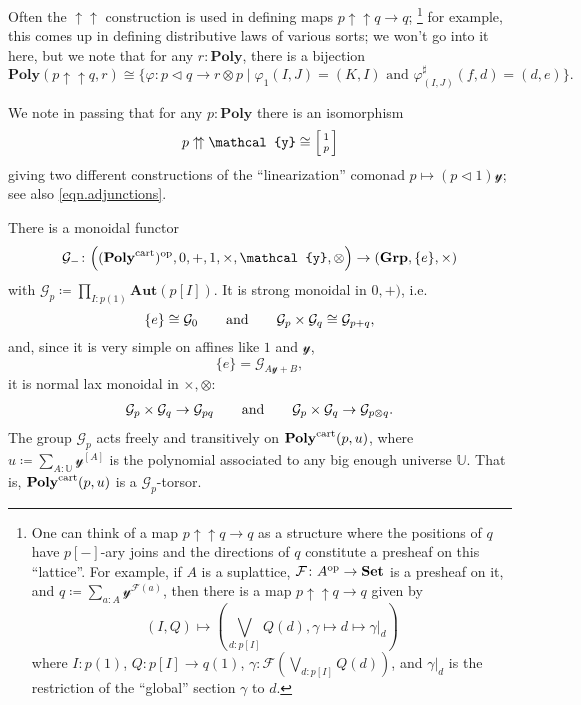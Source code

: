 \documentclass[11pt, one side, article]{memoir}
\makeatletter
\theoremstyle{definition}
\theoremstyle{plain}
\newcommand{\cat}[1]{\mathcal{#1}}%
\newcommand{\Cat}[1]{\mathbf{#1}}%
\newcommand{\op}{^\tn{op}}
\newcommand{\tn}[1]{\textnormal{#1}}
\newcommand{\smset}{\Cat{Set}}
\newcommand{\grp}{\Cat{Grp}}
\newcommand{\Aut}{\Cat{Aut}}
\newcommand{\yon}{{\mathcal{y}}}
\newcommand{\poly}{\Cat{Poly}}
\newcommand{\cart}{\tn{cart}}
\newcommand{\polycart}{\poly^\cart}
\newcommand{\0}{\textsf{0}}
\newcommand{\1}{\tn{\textsf{1}}}
\newcommand{\tri}{\mathbin{\triangleleft}}
\newcommand{\biglens}[2]{
     \begin{bmatrix}{\vphantom{f_f^f}#2} \\ {\vphantom{f_f^f}#1} \end{bmatrix}
}
\newcommand{\littlelens}[2]{
     \begin{bsmallmatrix}{\vphantom{f}#2} \\ {\vphantom{f}#1} \end{bsmallmatrix}
}
\newcommand{\lens}[2]{
  \relax\if@display
     \biglens{#1}{#2}
  \else
     \littlelens{#1}{#2}
  \fi
}
\newcommand{\upup}{\uparrow\!\uparrow}
\newcommand{\hh}[2][]{#1 \tn{#2} #1}
\newcommand{\qqand}{\hh[\qquad]{and}}
\makeatother
\begin{document}
Often the $\upup$ construction is used in defining maps $p\upup q\to q$;
\footnote{One can think of a map $p\upup q\to q$ as a structure where the positions of $q$ have $p[-]$-ary joins and the directions of $q$ constitute a presheaf on this ``lattice''. For example, if $A$ is a suplattice, $\cat{F}\colon A\op\to\smset$ is a presheaf on it, and $q\coloneqq\sum_{a:A}\yon^{\cat{F}(a)}$, then there is a map $p\upup q\to q$ given by
\[
  (I,Q)\mapsto
  \left(
  	\bigvee_{d:p[I]}Q(d), \gamma\mapsto d\mapsto \gamma\big|_d
  \right)
\]
where $I:p(1)$, $Q\colon p[I]\to q(1)$, $\gamma:\cat{F}(\bigvee_{d:p[I]}Q(d))$, and $\gamma\big|_{d}$ is the restriction of the ``global'' section $\gamma$ to $d$.
}
 for example, this comes up in defining distributive laws of various sorts; we won't go into it here, but we note that for any $r:\poly$, there is a bijection
\begin{equation}
\poly(p\upup q,r)\cong\{\varphi\colon p\tri q\to r\otimes p\mid\varphi_1(I,J)=(K,I)\text{ and }\varphi^\sharp_{(I,J)}(f,d)=(d,e)\}.
\end{equation}

We note in passing that for any $p:\poly$ there is an isomorphism
\begin{equation}
p\upup\yon\cong\lens{p}{1}
\end{equation}
giving two different constructions of the ``linearization'' comonad $p\mapsto (p\tri1)\yon$; see also \eqref{eqn.adjunctions}.

There is a monoidal functor 
\begin{equation}
	\cat{G}_-\colon\Big((\polycart)\op,0,+,1,\times,\yon,\otimes\Big)\to(\grp,\{e\},\times)
\end{equation}
with $\cat{G}_p\coloneqq\prod_{I:p(1)}\Aut(p[I])$. It is strong monoidal in $0,+)$, i.e.
\begin{equation}
	\{e\}\cong\cat{G}_0
	\qqand
	\cat{G}_p\times\cat{G}_q\cong\cat{G}_{p+q},
\end{equation}
and, since it is very simple on affines like $1$ and $\yon$,
\begin{equation}
\{e\}=\cat{G}_{A\yon+B},
\end{equation}
it is normal lax monoidal in $\times,\otimes$:
\begin{align}
	\cat{G}_{p}\times\cat{G}_q\to\cat{G}_{pq}
	\qqand
	\cat{G}_{p}\times\cat{G}_q\to\cat{G}_{p\otimes q}.	
\end{align}
The group $\cat{G}_p$ acts freely and transitively on $\polycart(p,u)$, where $u\coloneqq\sum_{A:\mathbb{U}}\yon^{[A]}$ is the polynomial associated to any big enough universe $\mathbb{U}$. That is, $\polycart(p,u)$ is a $\cat{G}_p$-torsor.
\end{document}
